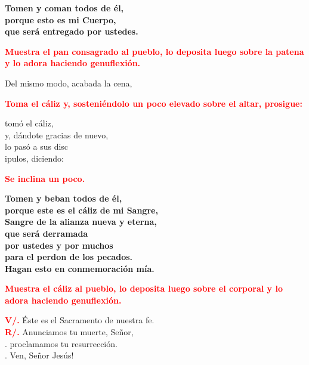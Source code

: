 \documentclass[12pt, letterpaper, spanish]{report}
\begin{document}
\LARGE{ \bfseries{ Tomen y coman todos de \'el,\\
porque esto es mi Cuerpo,\\
que ser\'a entregado por ustedes.}}\newline

\large{\bfseries \textcolor{red}{Muestra el pan consagrado al pueblo, lo deposita luego sobre la patena y lo adora haciendo genuflexi\'on.}}\newline

\Large Del mismo modo, acabada la cena,\newline

\large{\bfseries \textcolor{red}{Toma el c\'aliz y, sosteni\'endolo un poco elevado sobre el altar, prosigue:}}\newline

\Large tom\'o el c\'aliz,\\
y, d\'andote gracias de nuevo,\\
lo pas\'o a sus disc\\ipulos, diciendo:\newline

\large{\bfseries \textcolor{red}{Se inclina un poco.}}\newline

\LARGE{ \bfseries{ Tomen y beban todos de \'el,\\
porque este es el c\'aliz de mi Sangre,\\
Sangre de la alianza nueva y eterna,\\
que ser\'a derramada\\
por ustedes y por muchos\\
para el perdon de los pecados.\\
Hagan esto en conmemoraci\'on m\'ia.}}\newline

\large{\bfseries \textcolor{red}{Muestra el c\'aliz al pueblo, lo deposita luego sobre el corporal y lo adora haciendo genuflexi\'on.}}\newline

\Large \hspace{-0.9cm} {\bfseries \textcolor{red}{V/.}} \hspace{0.5cm} \'Este es el Sacramento de nuestra fe.\\
\Large \hspace{-0.9cm} {\bfseries \textcolor{red}{R/.}} \hspace{0.5cm} Anunciamos tu muerte, Se\~nor,\\
.\hspace{1.5cm} proclamamos tu resurrecci\'on.\\
.\hspace{1.5cm} Ven, Se\~nor Jes\'us!\newline
\end{document}
